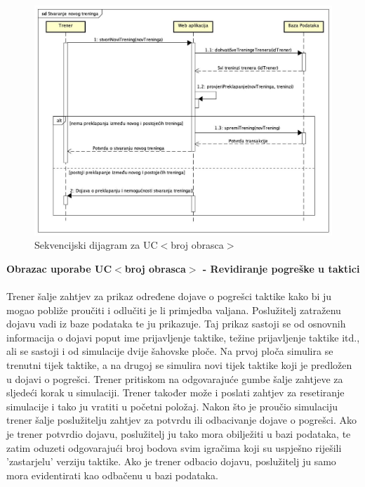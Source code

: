 				\begin{figure}[H]
					\centerfloat
        					\includegraphics[scale=0.48]{dijagrami/StvaranjeNovogTreninga.jpg} %
        					\caption{Sekvencijski dijagram za UC$<$broj obrasca$>$}
        					\label{fig:UC$<$broj obrasca$>$}
				\end{figure}
				
				\eject
				
				\textbf{Obrazac uporabe UC$<$broj obrasca$>$ - Revidiranje pogreške u taktici}\\
				\\Trener šalje zahtjev za prikaz određene dojave o pogrešci taktike kako bi ju mogao pobliže proučiti i odlučiti je li primjedba valjana. Poslužitelj zatraženu dojavu vadi iz baze podataka te ju prikazuje. Taj prikaz sastoji se od osnovnih informacija o dojavi poput ime prijavljenje taktike, težine prijavljenje taktike itd., ali se sastoji i od simulacije dvije šahovske ploče. Na prvoj ploča simulira se trenutni tijek taktike, a na drugoj se simulira novi tijek taktike koji je predložen u dojavi o pogrešci. Trener pritiskom na odgovarajuće gumbe šalje zahtjeve za sljedeći korak u simulaciji. Trener također može i poslati zahtjev za resetiranje simulacije i tako ju vratiti u početni položaj. Nakon što je proučio simulaciju trener šalje poslužitelju zahtjev za potvrdu ili odbacivanje dojave o pogrešci. Ako je trener potvrdio dojavu, poslužitelj ju tako mora obilježiti u bazi podataka, te zatim oduzeti odgovarajući broj bodova svim igračima koji su uspješno riješili 'zastarjelu' verziju taktike. Ako je trener odbacio dojavu, poslužitelj ju samo mora evidentirati kao odbačenu u bazi podataka.
			

